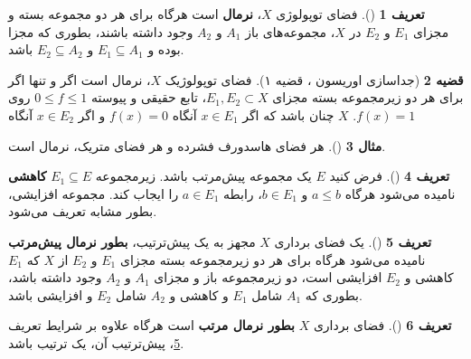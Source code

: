 \documentclass[12pt,a4paper]{article}
\theoremstyle{definition}
\newtheorem{definition}{تعریف}[section]
\theoremstyle{theorem}
\newtheorem{theorem}[definition]{قضیه}
\theoremstyle{definition}
\newtheorem{example}[definition]{مثال}
\begin{document}
\begin{definition}[\cite{Nachbin}]
 فضای توپولوژی 
$ X $،   
\textbf{نرمال}
 است هرگاه برای هر دو مجموعه بسته و مجزای 
$ E_{1} $
و
$ E_{2} $
در
$ X $،  مجموعه‌های باز 
$ A_{1} $
و
$ A_{2} $
وجود داشته باشند،   بطوری که مجزا بوده و
$ E_{1}\subseteq A_{1} $
و
$ E_{2}\subseteq A_{2} $
باشد.
\end{definition}
\begin{theorem}[جداسازی اوریسون  \cite{Nachbin}، قضیه ۱]\label{or}
فضای توپولوژیک $ X $،  نرمال است اگر و تنها اگر برای هر دو  زیرمجموعه بسته مجزای 
$ E_{1},E_{2}\subset X $،   تابع حقیقی و پیوسته  
$ 0\leq f \leq 1 $
روی 
$ X $
چنان باشد که اگر 
$ x\in E_{1} $
آنگاه 
$ f(x)=0 $
و اگر 
$ x\in E_{2} $
آنگاه
$.f(x)=1 $

\end{theorem}
\begin{example}[\cite{Nachbin}]

هر فضای هاسدورف فشرده و هر فضای متریک،  نرمال است.

\end{example}

\begin{definition}[\cite{Nachbin}]
فرض کنید 
$ E $
یک مجموعه پیش‌مرتب باشد.  زیرمجموعه 
$ E_{1}\subseteq E $
\mbox{\textbf{کاهشی}}
 نامیده می‌شود هرگاه 
$ a\leq b $
و
$ b\in E_{1} $، رابطه 
$ a\in E_{1} $
را ایجاب کند.  مجموعه افزایشی،  
بطور مشابه تعریف می‌شود.
\end{definition}

\begin{definition}[\cite{Nachbin}]\label{nor}
یک فضای برداری 
$ X $
مجهز  به یک پیش‌ترتیب، 
\textbf{بطور نرمال \linebreak پیش‌مرتب}
 نامیده می‌شود هرگاه برای هر دو زیرمجموعه بسته مجزای 
$ E_{1} $
و
$ E_{2} $
از 
$ X $
که 
$ E_{1} $
کاهشی و
$ E_{2} $
افزایشی است، دو زیرمجموعه باز و مجزای 
$ A_{1} $
و
$ A_{2} $
وجود داشته باشد،   بطوری که 
$ A_{1} $
شامل 
$ E_{1} $
و کاهشی و
$ A_{2} $
شامل 
$ E_{2} $
و افزایشی باشد.
\end{definition}
\begin{definition}[\cite{Nachbin}]
فضای برداری 
$ X $
\textbf{بطور نرمال مرتب}
 است هرگاه علاوه بر شرایط تعریف
\ref{nor}، پیش‌ترتیب آن، یک ترتیب باشد.
\end{definition}
\end{document}
